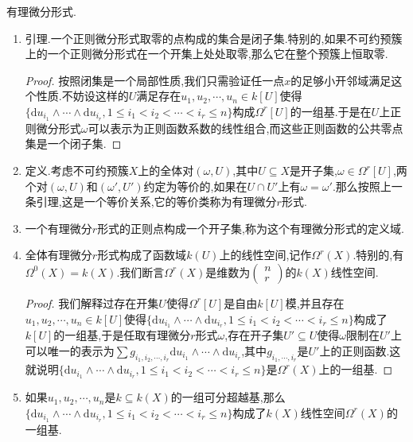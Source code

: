 有理微分形式.
\begin{enumerate}
	\item 引理.一个正则微分形式取零的点构成的集合是闭子集.特别的,如果不可约预簇上的一个正则微分形式在一个开集上处处取零,那么它在整个预簇上恒取零.
	\begin{proof}
		
		按照闭集是一个局部性质,我们只需验证任一点$x$的足够小开邻域满足这个性质.不妨设这样的$U$满足存在$u_1,u_2,\cdots,u_n\in k[U]$使得$\{\mathrm{d}u_{i_1}\wedge\cdots\wedge\mathrm{d}u_{i_r},1\le i_1<i_2<\cdots<i_r\le n\}$构成$\Omega^r[U]$的一组基.于是在$U$上正则微分形式$\omega$可以表示为正则函数系数的线性组合,而这些正则函数的公共零点集是一个闭子集.
	\end{proof}
    \item 定义.考虑不可约预簇$X$上的全体对$(\omega,U)$,其中$U\subseteq X$是开子集,$\omega\in\Omega^r[U]$,两个对$(\omega,U)$和$(\omega',U')$约定为等价的,如果在$U\cap U'$上有$\omega=\omega'$.那么按照上一条引理,这是一个等价关系,它的等价类称为有理微分$r$形式.
    \item 一个有理微分$r$形式的正则点构成一个开子集,称为这个有理微分形式的定义域.
    \item 全体有理微分$r$形式构成了函数域$k(U)$上的线性空间,记作$\Omega^r(X)$.特别的,有$\Omega^0(X)=k(X)$.我们断言$\Omega^r(X)$是维数为$\left(\begin{array}{c}n\\r\end{array}\right)$的$k(X)$线性空间.
    \begin{proof}
    	
    	我们解释过存在开集$U$使得$\Omega^r[U]$是自由$k[U]$模,并且存在$u_1,u_2,\cdots,u_n\in k[U]$使得$\{\mathrm{d}u_{i_1}\wedge\cdots\wedge\mathrm{d}u_{i_r},1\le i_1<i_2<\cdots<i_r\le n\}$构成了$k[U]$的一组基,于是任取有理微分$r$形式$\omega$,存在开子集$U'\subseteq U$使得$\omega$限制在$U'$上可以唯一的表示为$\sum g_{i_1,i_2,\cdots,i_r}\mathrm{d}u_{i_1}\wedge\cdots\wedge\mathrm{d}u_{i_r}$,其中$g_{i_1,\cdots,i_r}$是$U'$上的正则函数.这就说明$\{\mathrm{d}u_{i_1}\wedge\cdots\wedge\mathrm{d}u_{i_r},1\le i_1<i_2<\cdots<i_r\le n\}$是$\Omega^r(X)$上的一组基.
    \end{proof}
    \item 如果$u_1,u_2,\cdots,u_n$是$k\subseteq k(X)$的一组可分超越基,那么$\{\mathrm{d}u_{i_1}\wedge\cdots\wedge\mathrm{d}u_{i_r},1\le i_1<i_2<\cdots<i_r\le n\}$构成了$k(X)$线性空间$\Omega^r(X)$的一组基.
\end{enumerate}

